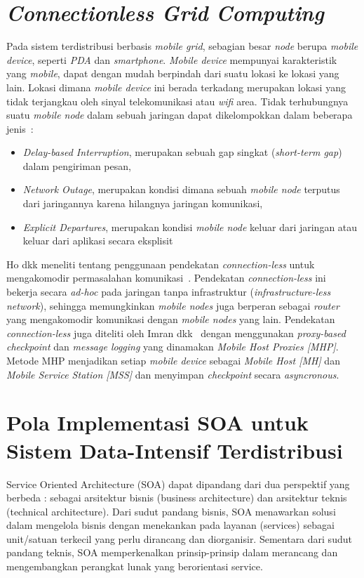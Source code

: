 \section{\textit{Connectionless Grid Computing}}
Pada sistem terdistribusi berbasis \textit{mobile grid}, sebagian besar \textit{node} berupa \textit{mobile device}, seperti \textit{PDA} dan \textit{smartphone}. \textit{Mobile device} mempunyai karakteristik yang \textit{mobile}, dapat dengan mudah berpindah dari suatu lokasi ke lokasi yang lain. Lokasi dimana \textit{mobile device} ini berada terkadang merupakan lokasi yang tidak terjangkau oleh sinyal telekomunikasi atau \textit{wifi} area. Tidak terhubungnya suatu \textit{mobile node} dalam sebuah jaringan dapat dikelompokkan dalam beberapa jenis~\cite{gutwin_gone_2010}:
\begin{itemize}
\item \textit{Delay-based Interruption}, merupakan sebuah gap singkat (\textit{short-term gap}) dalam pengiriman pesan, 
\item \textit{Network Outage}, merupakan kondisi dimana sebuah \textit{mobile node} terputus dari jaringannya karena hilangnya jaringan komunikasi, 
\item \textit{Explicit Departures}, merupakan kondisi \textit{mobile node} keluar dari jaringan atau keluar dari aplikasi secara eksplisit
\end{itemize}
Ho dkk meneliti tentang penggunaan pendekatan \textit{connection-less} untuk mengakomodir permasalahan komunikasi~\cite{ho_connectionless_2004}. Pendekatan \textit{connection-less} ini bekerja secara \textit{ad-hoc} pada jaringan tanpa infrastruktur (\textit{infrastructure-less network}), sehingga memungkinkan \textit{mobile nodes} juga berperan sebagai \textit{router} yang mengakomodir komunikasi dengan \textit{mobile nodes} yang lain. Pendekatan \textit{connection-less} juga diteliti oleh Imran dkk~\cite{imran_proxy-based_2007} dengan menggunakan \textit{proxy-based checkpoint} dan \textit{message logging} yang dinamakan \textit{Mobile Host Proxies [MHP]}. Metode MHP menjadikan setiap \textit{mobile device} sebagai \textit{Mobile Host [MH]} dan \textit{Mobile Service Station [MSS]} dan menyimpan \textit{checkpoint} secara \textit{asyncronous}.

\section{Pola Implementasi SOA untuk Sistem Data-Intensif Terdistribusi}
Service Oriented Architecture (SOA) dapat dipandang dari dua perspektif yang berbeda : sebagai arsitektur bisnis (business architecture) dan arsitektur teknis (technical architecture). Dari sudut pandang bisnis, SOA menawarkan solusi dalam mengelola bisnis dengan menekankan pada layanan (services) sebagai unit/satuan terkecil yang perlu dirancang dan diorganisir. Sementara dari sudut pandang teknis, SOA memperkenalkan prinsip-prinsip dalam merancang dan mengembangkan perangkat lunak yang berorientasi service.

